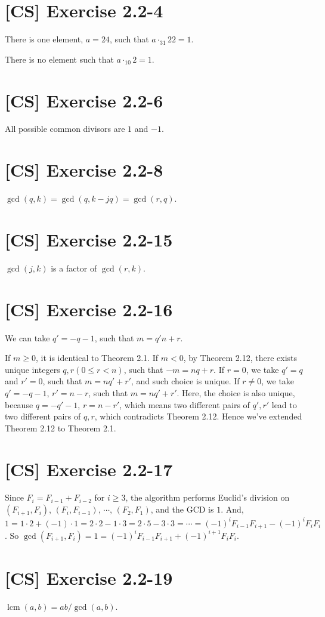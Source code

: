 \documentclass[a4paper,11pt,twocolumn]{article}
\newcommand{\lcm}{\mathop{\mathrm{lcm}}}
\begin{document}
  \section{[CS] Exercise 2.2-4}
  There is one element, $a = 24$, such that $a \cdot_{31} 22 = 1$. \par
  There is no element such that $a \cdot_{10} 2 = 1$.

  \section{[CS] Exercise 2.2-6}
  All possible common divisors are $1$ and $-1$.

  \section{[CS] Exercise 2.2-8}
  $\gcd(q, k) = \gcd(q, k-jq) = \gcd(r, q)$.

  \section{[CS] Exercise 2.2-15}
  $\gcd(j, k)$ is a factor of $\gcd(r, k)$.

  \section{[CS] Exercise 2.2-16}
  We can take $q' = -q-1$, such that $m = q'n + r$. \par
  If $m \geq 0$, it is identical to Theorem 2.1. If $m < 0$, by Theorem 2.12, there exists unique integers $q, r (0 \leq r < n)$, such that $-m = nq + r$. If $r = 0$, we take $q' = q$ and $r' = 0$, such that $m = nq' + r'$, and such choice is unique. If $r \neq 0$, we take $q' =  - q - 1$, $r' = n - r$, such that $m = nq' + r'$. Here, the choice is also unique, because $q = -q' - 1$, $r = n - r'$, which means two different pairs of $q', r'$ lead to two different pairs of $q, r$, which contradicts Theorem 2.12. Hence we've extended Theorem 2.12 to Theorem 2.1.

  \section{[CS] Exercise 2.2-17}
  Since $F_i = F_{i-1} + F_{i-2}$ for $i \geq 3$, the algorithm performs Euclid's division on $(F_{i+1}, F_{i})$, $(F_{i}, F_{i-1})$, $\cdots$, $(F_2, F_1)$, and the GCD is $1$. And, $1 = 1 \cdot 2 + (-1) \cdot 1 = 2 \cdot 2 - 1 \cdot 3 = 2 \cdot 5 - 3 \cdot 3 = \cdots = (-1) ^ i F_{i-1} F_{i+1} - (-1)^i F_i F_i$. So $\gcd(F_{i+1}, F_i) = 1 = (-1)^i F_{i-1} F_{i+1} + (-1)^{i+1} F_i F_i$.

  \section{[CS] Exercise 2.2-19}
  $ \lcm(a, b) = ab/\gcd(a, b)  $.
\end{document}
